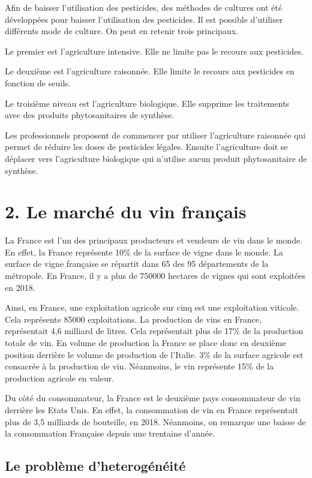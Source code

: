 \documentclass[11pt,]{article}
\begin{document}
Afin de baisser l'utilisation des pesticides, des méthodes de cultures
ont été développées pour baisser l'utilisation des pesticides. Il est
possible d'utiliser différents mode de culture. On peut en retenir trois
principaux.

Le premier est l'agriculture intensive. Elle ne limite pas le recours
aux pesticides.

Le deuxième est l'agriculture raisonnée. Elle limite le recours aux
pesticides en fonction de seuils.

Le troisième niveau est l'agriculture biologique. Elle supprime les
traitements avec des produits phytosanitaires de synthèse.

Les professionnels proposent de commencer par utiliser l'agriculture
raisonnée qui permet de réduire les doses de pesticides légales. Ensuite
l'agriculture doit se déplacer vers l'agriculture biologique qui
n'utilise aucun produit phytosanitaire de synthèse.

\hypertarget{le-marche-du-vin-francais}{%
\section{2. Le marché du vin français}\label{le-marche-du-vin-francais}}

La France est l'un des principaux producteurs et vendeurs de vin dans le
monde. En effet, la France représente 10\% de la surface de vigne dans
le monde. La surface de vigne française se répartit dans 65 des 95
départements de la métropole. En France, il y a plus de 750000 hectares
de vignes qui sont exploitées en 2018.

Ainsi, en France, une exploitation agricole sur cinq est une
exploitation viticole. Cela représente 85000 exploitations. La
production de vins en France, représentait 4,6 milliard de litres. Cela
représentait plus de 17\% de la production totale de vin. En volume de
production la France se place donc en deuxième position derrière le
volume de production de l'Italie. 3\% de la surface agricole est
consacrée à la production de vin. Néanmoins, le vin représente 15\% de
la production agricole en valeur.

Du côté du consommateur, la France est le deuxième pays consommateur de
vin derrière les Etats Unis. En effet, la consommation de vin en France
représentait plus de 3,5 milliards de bouteille, en 2018. Néanmoins, on
remarque une baisse de la consommation Française depuis une trentaine
d'année.

\hypertarget{le-probleme-dheterogeneite}{%
\subsection{Le problème
d'heterogénéité}\label{le-probleme-dheterogeneite}}
\end{document}

